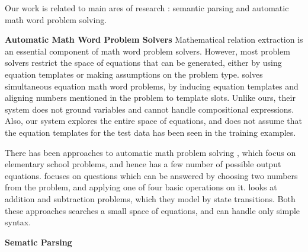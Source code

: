   Our work is related to main ares of research : semantic parsing and
  automatic math word problem solving.

  \noindent
  \textbf{Automatic Math Word Problem Solvers} Mathematical relation
  extraction is an essential component of math word problem
  solvers. However, most problem solvers restrict the space of
  equations that can be generated, either by using equation templates
  or making assumptions on the problem type. \cite{Kushman} solves
  simultaneous equation math word problems, by inducing equation
  templates and aligning numbers mentioned in the problem to template
  slots. Unlike ours, their system does not ground variables and
  cannot handle compositional expressions. Also, our system explores
  the entire space of equations, and does not assume that the equation
  templates for the test data has been seen in the training examples.

  There has been approaches to automatic math problem solving
  \cite{Roy, AI2}, which focus on elementary school problems, and
  hence has a few number of possible output equations. \cite{Roy}
  focuses on questions which can be answered by choosing two numbers
  from the problem, and applying one of four basic operations on
  it. \cite{AI2} looks at addition and subtraction problems, which
  they model by state transitions. Both these approaches searches a
  small space of equations, and can handle only simple syntax.

  \noindent
  \textbf{Sematic Parsing} 
  
